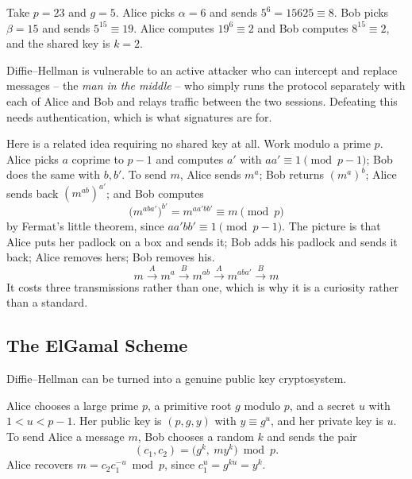 \begin{example}
	Take $p = 23$ and $g = 5$. Alice picks $\alpha = 6$ and sends $5^6 = 15625 \equiv 8$. Bob picks $\beta = 15$ and sends $5^{15}\equiv19$. Alice computes $19^6 \equiv 2$ and Bob computes $8^{15}\equiv2$, and the shared key is $k = 2$.
\end{example}

\begin{remark}
	Diffie--Hellman is vulnerable to an active attacker who can intercept and replace messages -- the \emph{man in the middle} -- who simply runs the protocol separately with each of Alice and Bob and relays traffic between the two sessions. Defeating this needs authentication, which is what signatures are for.
\end{remark}

\begin{example}
	Here is a related idea requiring no shared key at all. Work modulo a prime $p$. Alice picks $a$ coprime to $p-1$ and computes $a'$ with $aa'\equiv1\pmod{p-1}$; Bob does the same with $b, b'$. To send $m$, Alice sends $m^a$; Bob returns $(m^a)^b$; Alice sends back $(m^{ab})^{a'}$; and Bob computes
	$$\bigl(m^{aba'}\bigr)^{b'} = m^{aa'bb'} \equiv m \pmod p$$
	by Fermat's little theorem, since $aa'bb'\equiv1\pmod{p-1}$. The picture is that Alice puts her padlock on a box and sends it; Bob adds his padlock and sends it back; Alice removes hers; Bob removes his.
	$$m \xrightarrow{\ A\ } m^a \xrightarrow{\ B\ } m^{ab} \xrightarrow{\ A\ } m^{aba'} \xrightarrow{\ B\ } m$$
	It costs three transmissions rather than one, which is why it is a curiosity rather than a standard.
\end{example}

\subsection{The ElGamal Scheme}

Diffie--Hellman can be turned into a genuine public key cryptosystem.

\begin{definition}
	Alice chooses a large prime $p$, a primitive root $g$ modulo $p$, and a secret $u$ with $1<u<p-1$. Her public key is $(p,g,y)$ with $y \equiv g^u$, and her private key is $u$. To send Alice a message $m$, Bob chooses a random $k$ and sends the pair
	$$(c_1,c_2) = \bigl(g^k,\ my^k\bigr) \bmod p.$$
	Alice recovers $m = c_2 c_1^{-u} \bmod p$, since $c_1^u = g^{ku} = y^k$.
\end{definition}

